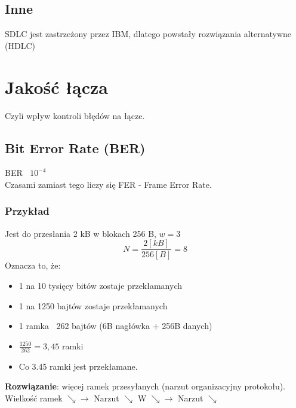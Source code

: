 \documentclass[a4paper,twoside]{article}
\begin{document}
	\subsection{Inne}
		SDLC jest zastrzeżony przez IBM, dlatego powstały rozwiązania alternatywne (HDLC)
	
\section{Jakość łącza}
Czyli wpływ kontroli błędów na łącze.\\
\subsection{Bit Error Rate (BER)}
BER $ ~ $ $ 10^{-4} $ \\
Czasami zamiast tego liczy się FER - Frame Error Rate.
\subsubsection{Przykład}
Jest do przesłania 2 kB w blokach 256 B, $ w = 3 $\\
\begin{equation}
 N = \frac{2[kB]}{256[B]}=8 
\end{equation}
Oznacza to, że:
\begin{itemize}
	\item 1 na 10 tysięcy bitów zostaje przekłamanych
	\item 1 na 1250 bajtów zostaje przekłamanych
	\item 1 ramka $ ~ $ 262 bajtów (6B nagłówka + 256B danych)
	\item $ \frac{1250}{262}=3,45 $ ramki
	\item Co 3.45 ramki jest przekłamane.
\end{itemize}
\textbf{Rozwiązanie}: więcej ramek przesyłanych (narzut organizacyjny protokołu).\\
Wielkość ramek $ \searrow \rightarrow $ Narzut $ \searrow $ W $ \searrow \rightarrow $ Narzut $ \searrow $
\end{document}
